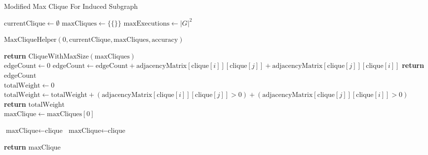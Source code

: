 \begin{algorithm}
    \caption{Modified Max Clique For Induced Subgraph}\label{alg:modmaxclique}
    \begin{algorithmic}[1]
        \State $\text{currentClique} \gets \emptyset$
        \State $\text{maxCliques} \gets \{\{\}\}$
            \State $\text{maxExecutions} \gets |G|^2$
        \EndIf
    
        \State $\text{MaxCliqueHelper}(0, \text{currentClique}, \text{maxCliques}, \text{accuracy})$
    
        \State \textbf{return} $\text{CliqueWithMaxSize}(\text{maxCliques})$
    \EndProcedure
    \\
        \State $\text{edgeCount} \gets 0$
                \State $\text{edgeCount} \gets \text{edgeCount} + \text{adjacencyMatrix}[\text{clique}[i]][\text{clique}[j]] + \text{adjacencyMatrix}[\text{clique}[j]][\text{clique}[i]]$
            \EndFor
        \EndFor
        \State \textbf{return} $\text{edgeCount}$
    \EndProcedure
    \\
        \State $\text{totalWeight} \gets 0$
                \State $\text{totalWeight} \gets \text{totalWeight} + (\text{adjacencyMatrix}[\text{clique}[i]][\text{clique}[j]] > 0) + (\text{adjacencyMatrix}[\text{clique}[j]][\text{clique}[i]] > 0)$
            \EndFor
        \EndFor
        \State \textbf{return} $\text{totalWeight}$
    \EndProcedure
    \\
        \State $\text{maxClique} \gets \text{maxCliques}[0]$
        
                \State $\text{maxClique} \gets \text{clique}$
                    \State $\text{maxClique} \gets \text{clique}$
                \EndIf
            \EndIf
        \EndFor
        
        \State \textbf{return} $\text{maxClique}$
    \EndProcedure

    \end{algorithmic}
\end{algorithm}